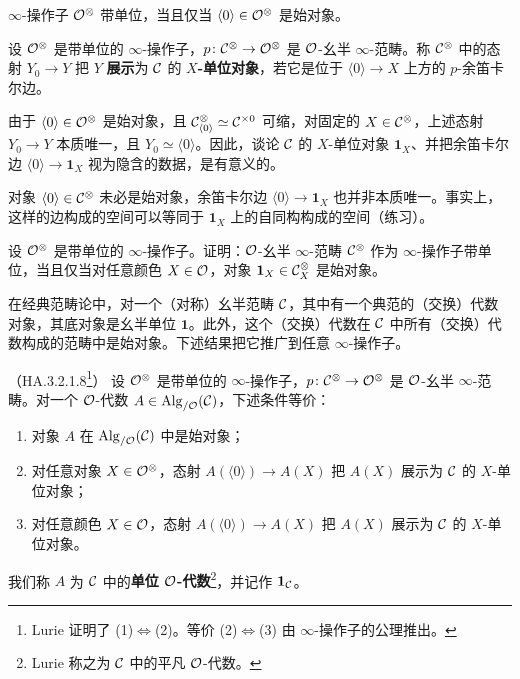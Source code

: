 \begin{exercise}\label{L22-3.9}
$\infty$-操作子 $\mathcal{O}^{\otimes}$ 带单位，当且仅当 $\langle0\rangle\in\mathcal{O}^{\otimes}$ 是始对象。
\end{exercise}

\begin{definition}\label{L22-3.10}
设 $\mathcal{O}^{\otimes}$ 是带单位的 $\infty$-操作子，$p\colon\mathcal{C}^{\otimes}\to\mathcal{O}^{\otimes}$ 是 $\mathcal{O}$-幺半 $\infty$-范畴。称 $\mathcal{C}^{\otimes}$ 中的态射 $Y_{0}\to Y$ 把 $Y$ \textbf{展示}为 $\mathcal{C}$ 的 \textbf{$X$-单位对象}，若它是位于 $\langle0\rangle\to X$ 上方的 $p$-余笛卡尔边。
\end{definition}

\nitem\label{L22-3.11} 由于 $\langle0\rangle\in\mathcal{O}^{\otimes}$ 是始对象，且 $\mathcal{C}^{\otimes}_{\langle0\rangle}\simeq\mathcal{C}^{\times0}$ 可缩，对固定的 $X\in\mathcal{C}^{\otimes}$，上述态射 $Y_{0}\to Y$ 本质唯一，且 $Y_{0}\simeq\langle0\rangle$。因此，谈论 $\mathcal{C}$ 的 $X$-单位对象 $\mathbf{1}_{X}$、并把余笛卡尔边 $\langle0\rangle\to\mathbf{1}_{X}$ 视为隐含的数据，是有意义的。

\begin{warning}\label{L22-3.12}
对象 $\langle0\rangle\in\mathcal{C}^{\otimes}$ 未必是始对象，余笛卡尔边 $\langle0\rangle\to\mathbf{1}_{X}$ 也并非本质唯一。事实上，这样的边构成的空间可以等同于 $\mathbf{1}_{X}$ 上的自同构构成的空间（练习）。
\end{warning}

\begin{exercise}\label{L22-3.13}
设 $\mathcal{O}^{\otimes}$ 是带单位的 $\infty$-操作子。证明：$\mathcal{O}$-幺半 $\infty$-范畴 $\mathcal{C}^{\otimes}$ 作为 $\infty$-操作子带单位，当且仅当对任意颜色 $X\in\mathcal{O}$，对象 $\mathbf{1}_{X}\in\mathcal{C}^{\otimes}_{X}$ 是始对象。
\end{exercise}

\nitem\label{L22-3.14} 在经典范畴论中，对一个（对称）幺半范畴 $\mathcal{C}$，其中有一个典范的（交换）代数对象，其底对象是幺半单位 $\mathbf{1}$。此外，这个（交换）代数在 $\mathcal{C}$ 中所有（交换）代数构成的范畴中是始对象。下述结果把它推广到任意 $\infty$-操作子。

\begin{theoremdef}\label{L22-3.15}（HA.3.2.1.8\footnote{Lurie 证明了 (1)$\Leftrightarrow$(2)。等价 (2)$\Leftrightarrow$(3) 由 $\infty$-操作子的公理推出。}）
设 $\mathcal{O}^{\otimes}$ 是带单位的 $\infty$-操作子，$p\colon\mathcal{C}^{\otimes}\to\mathcal{O}^{\otimes}$ 是 $\mathcal{O}$-幺半 $\infty$-范畴。对一个 $\mathcal{O}$-代数 $A\in\operatorname{Alg}_{/\mathcal{O}}(\mathcal{C})$，下述条件等价：
\begin{enumerate}[label=(\arabic*),leftmargin=2.4em,itemsep=0.1em]
\item 对象 $A$ 在 $\operatorname{Alg}_{/\mathcal{O}}(\mathcal{C})$ 中是始对象；
\item 对任意对象 $X\in\mathcal{O}^{\otimes}$，态射 $A(\langle0\rangle)\to A(X)$ 把 $A(X)$ 展示为 $\mathcal{C}$ 的 $X$-单位对象；
\item 对任意颜色 $X\in\mathcal{O}$，态射 $A(\langle0\rangle)\to A(X)$ 把 $A(X)$ 展示为 $\mathcal{C}$ 的 $X$-单位对象。
\end{enumerate}
我们称 $A$ 为 $\mathcal{C}$ 中的\textbf{单位 $\mathcal{O}$-代数}\footnote{Lurie 称之为 $\mathcal{C}$ 中的平凡 $\mathcal{O}$-代数。}，并记作 $\mathbf{1}_{\mathcal{C}}$。
\end{theoremdef}

